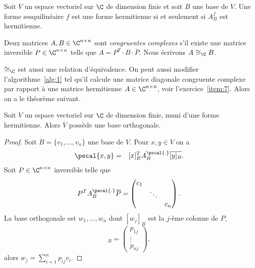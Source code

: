 \begin{proposition}
  \label{prop:3}
  Soit  $V$  un espace vectoriel sur $\C$ de dimension finie et soit $B$  une base de $V$. Une forme sesquilinéaire $f$ est une forme hermitienne si et seulement si $A_B^f$ est hermitienne.  
\end{proposition}


\begin{definition}
  \label{def:18}
  Deux matrices $A,B \in \C^{n \times n}$ sont \emph{congruentes complexes} s'il existe une matrice inversible $P \in \C^{n \times n}$ telle que $A = {P^T} \cdot B \cdot \overline{P}$. Nous écrivons $A \cong_\C B$.  
\end{definition}
$\cong_\C$ est aussi une relation d'équivalence. On peut aussi modifier l'algorithme~\ref{alg:1} tel qu'il calcule une matrice diagonale congruente complexe par rapport à une matrice hermitienne $A \in \C^{n \times n}$,  voir l'exercice~\ref{item:7}. Alors on a le théorème suivant. 

\begin{theorem}
  \label{thr:11}
  Soit $V$ un espace vectoriel sur $\C$ de dimension finie, muni d'une forme  hermitienne. Alors $V$ possède une base orthogonale. 
\end{theorem}
\begin{proof}
  Soit $B = \{v_1,\dots,v_n\}$  une base de $V$. Pour $x,y \in V$ on a 
  \begin{eqnarray*}
    \pscal{x,y} & = & [x]_B^T A_B^{\pscal{.}} \overline{[y]_B}. 
  \end{eqnarray*}
  Soit $P \in \C^{n\times n} $ inversible telle que
  \begin{displaymath}
    P^T A_B^{\pscal{.}} \overline{P} =
    \begin{pmatrix}
      c_1\\
      & \ddots \\
      && c_n
    \end{pmatrix}. 
  \end{displaymath}
  La base orthogonale est $w_1,\dots,w_n$ dont $ [w_j]_B$ est  la $j$-ème colonne de $P$, 
  \begin{displaymath}
     [w_j]_B =
  \begin{pmatrix}
    p_{1j}\\ \vdots \\ p_{nj}
  \end{pmatrix}, 
  \end{displaymath} 
alors $w_j = \sum_{i=1}^n p_{ij} v_i$. 

\end{proof}



